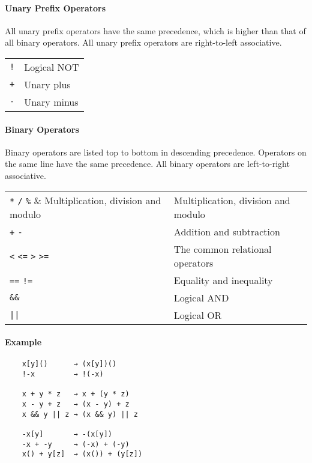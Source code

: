 \paragraph{Unary Prefix Operators}

All unary prefix operators have the same precedence, which is higher than that of all binary operators. All unary prefix operators are right-to-left associative.

\begin{table}[H]
    \begin{tabular}{ l l }
        \verb|!| & Logical NOT \\
        \verb|+| & Unary plus  \\
        \verb|-| & Unary minus
    \end{tabular}
\end{table}

\paragraph{Binary Operators}

Binary operators are listed top to bottom in descending precedence. Operators on the same line have the same precedence. All binary operators are left-to-right associative.

\begin{table}[H]
    \begin{tabular}{ l l }
        \verb|*| \verb|/| \verb|%|            & Multiplication, division and modulo \\
        \verb|+| \verb|-|                     & Addition and subtraction            \\
        \verb|<| \verb|<=| \verb|>| \verb|>=| & The common relational operators     \\
        \verb|==| \verb|!=|                   & Equality and inequality             \\
        \verb|&&|                             & Logical AND                         \\
        \verb!||!                             & Logical OR
    \end{tabular}
\end{table}

\paragraph{Example}

\begin{verbatim}
    x[y]()      → (x[y])()
    !-x         → !(-x)

    x + y * z   → x + (y * z)
    x - y + z   → (x - y) + z
    x && y || z → (x && y) || z

    -x[y]       → -(x[y])
    -x + -y     → (-x) + (-y)
    x() + y[z]  → (x()) + (y[z])
\end{verbatim}


